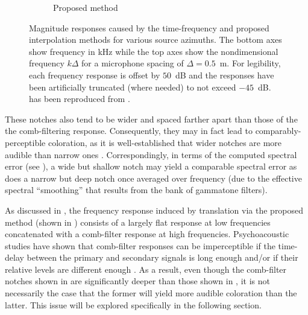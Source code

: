 \begin{figure}[t]
\begin{subfigure}[b]{0.49\textwidth}
    \caption{Proposed method}
    \label{fig:09_Thiergart_Comparison:Azimuth_Dependence:Hybrid}
  \end{subfigure}

  \caption[Magnitude responses across azimuths for each interpolation method.]{
  Magnitude responses caused by the time-frequency and proposed interpolation methods for various source azimuths.
  The bottom axes show frequency in kHz while the top axes show the nondimensional frequency $k\Delta$ for a microphone spacing of $\Delta = 0.5$~m.
  For legibility, each frequency response is offset by $50$~dB and the responses have been artificially truncated (where needed) to not exceed $-45$~dB.
   has been reproduced from .}
  \label{fig:09_Thiergart_Comparison:Azimuth_Dependence}
\end{figure} %

These notches also tend to be wider and spaced farther apart than those of the the comb-filtering response.
Consequently, they may in fact lead to comparably-perceptible coloration, as it is well-established that wider notches are more audible than narrow ones \citep{Bucklein1981}.
Correspondingly, in terms of the computed spectral error (see ), a wide but shallow notch may yield a comparable spectral error as does a narrow but deep notch once averaged over frequency (due to the effective spectral ``smoothing'' that results from the bank of gammatone filters).

As discussed in , the frequency response induced by translation via the proposed method (shown in ) consists of a largely flat response at low frequencies concatenated with a comb-filter response at high frequencies.
Psychoacoustic studies have shown that comb-filter responses can be imperceptible if the time-delay between the primary and secondary signals is long enough and/or if their relative levels are different enough \citep{Kates1984,Brunner2007}.
As a result, even though the comb-filter notches shown in  are significantly deeper than those shown in , it is not necessarily the case that the former will yield more audible coloration than the latter.
This issue will be explored specifically in the following section.

